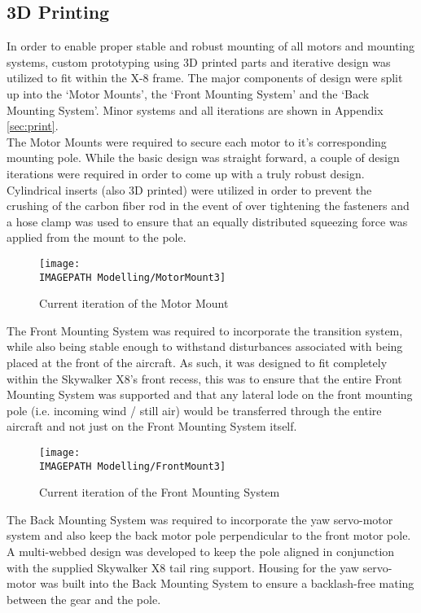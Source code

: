 \subsection{3D Printing}
In order to enable proper stable and robust mounting of all motors and mounting systems, custom prototyping using 3D printed parts and iterative design was utilized to fit within the X-8 frame. The major components of design were split up into the `Motor Mounts', the `Front  Mounting System' and the `Back Mounting System'. Minor systems and all iterations are shown in Appendix \ref{sec:print}.\\

The Motor Mounts were required to secure each motor to it's corresponding mounting pole. While the basic design was straight forward, a couple of design iterations were required in order to come up with a truly robust design. Cylindrical inserts (also 3D printed) were utilized in order to prevent the crushing of the carbon fiber rod in the event of over tightening the fasteners and a hose clamp was used to ensure that an equally distributed squeezing force was applied from the mount to the pole.\\

\begin{figure}[!ht]
	\centering
	\texttt{[image: \\IMAGEPATH Modelling/MotorMount3]}
	\caption{Current iteration of the Motor Mount}
	\label{fig:designmotormount}
\end{figure}
	
The Front Mounting System was required to incorporate the transition system, while also being stable enough to withstand disturbances associated with being placed at the front of the aircraft. As such, it was designed to fit completely within the Skywalker X8's front recess, this was to ensure that the entire Front Mounting System was supported and that any lateral lode on the front mounting pole (i.e. incoming wind / still air) would be transferred through the entire aircraft and not just on the Front Mounting System itself.\\

\begin{figure}[!ht]
	\centering
	\texttt{[image: \\IMAGEPATH Modelling/FrontMount3]}
	\caption{Current iteration of the Front Mounting System}
	\label{fig:designfrontmount}
\end{figure}
	
The Back Mounting System was required to incorporate the yaw servo-motor system and also keep the back motor pole perpendicular to the front motor pole. A multi-webbed design was developed to keep the pole aligned in conjunction with the supplied Skywalker X8 tail ring support. Housing for the yaw servo-motor was built into the Back Mounting System to ensure a backlash-free mating between the gear and the pole.\\


